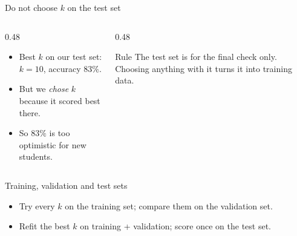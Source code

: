 \documentclass[handout,aspectratio=169,t,9pt]{beamer}
\newcommand{\datablock}[5]{%
  \fill[#4] (#1,#3) rectangle (#2,#3+0.55);
  \draw[white,thick] (#1,#3) rectangle (#2,#3+0.55);
  \node[font=\scriptsize,text=white] at ({(#1+#2)/2},#3+0.275) {#5};}
\begin{document}
\begin{frame}{Do not choose $k$ on the test set}
  \vspace{0.3cm}
  \begin{columns}[T,onlytextwidth]
    \begin{column}{0.48\textwidth}
      \begin{itemize}
        \item Best $k$ on our test set: $k = 10$, accuracy $83\%$.
        \item But we \emph{chose} $k$ because it scored best there.
        \item So $83\%$ is too optimistic for new students.
      \end{itemize}
    \end{column}
    \begin{column}{0.48\textwidth}
      \begin{keypoint}{Rule}
        The test set is for the final check only.  Choosing anything with
        it turns it into training data.
      \end{keypoint}
    \end{column}
  \end{columns}

\end{frame}

\begin{frame}{Training, validation and test sets}
  \vspace{0.3cm}
  \centering

  \vspace{0.6cm}
  \raggedright
  \begin{itemize}
    \item Try every $k$ on the training set; compare them on the
          validation set.
    \item Refit the best $k$ on training + validation; score once on the
          test set.
  \end{itemize}

  \vfill
\end{frame}
\end{document}
